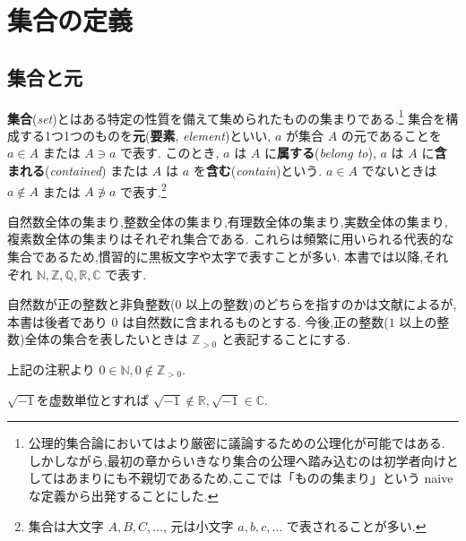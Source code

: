 \section{集合の定義}

\subsection{集合と元}

\textbf{集合}(\textit{set})とはある特定の性質を備えて集められたものの集まりである.\footnote{
    公理的集合論においてはより厳密に議論するための公理化が可能ではある.
    しかしながら,最初の章からいきなり集合の公理へ踏み込むのは初学者向けとしてはあまりにも不親切であるため,ここでは「ものの集まり」という naive な定義から出発することにした.
}
集合を構成する1つ1つのものを\textbf{元}(\textbf{要素}, \textit{element})といい,
$a$ が集合 $A$ の元であることを $a\in A$ または $A\ni a$ で表す.
このとき, $a$ は $A$ に\textbf{属する}(\textit{belong to}),
$a$ は $A$ に\textbf{含まれる}(\textit{contained})
または $A$ は $a$ を\textbf{含む}(\textit{contain})という.
$a\in A$ でないときは $a\not\in A$ または $A\not\ni a$ で表す.\footnote{
    集合は大文字 $A,B,C,\dots$, 元は小文字 $a,b,c,\dots$ で表されることが多い.
}

\begin{exa}
    自然数全体の集まり,整数全体の集まり,有理数全体の集まり,実数全体の集まり,複素数全体の集まりはそれぞれ集合である.
    これらは頻繁に用いられる代表的な集合であるため,慣習的に黒板文字や太字で表すことが多い.
    本書では以降,それぞれ $\mathbb{N},\mathbb{Z},\mathbb{Q},\mathbb{R},\mathbb{C}$ で表す.
\end{exa}

\begin{rem*}
    自然数が正の整数と非負整数($0$ 以上の整数)のどちらを指すのかは文献によるが,
    本書は後者であり $0$ は自然数に含まれるものとする.
    今後,正の整数($1$ 以上の整数)全体の集合を表したいときは $\mathbb{Z}_{>0}$ と表記することにする.
\end{rem*}


\begin{exa}
    上記の注釈より $0\in\mathbb{N},0\not\in\mathbb{Z}_{>0}$.
\end{exa}

\begin{exa}
    $\sqrt{-1}$を虚数単位とすれば $\sqrt{-1}\not\in\mathbb{R},\sqrt{-1}\in\mathbb{C}$.
\end{exa}

